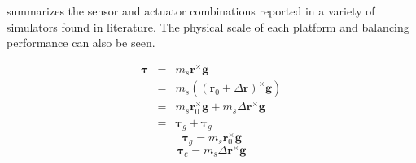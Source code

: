 summarizes the sensor and actuator combinations reported in a variety of simulators found in literature. The physical scale of each platform and balancing performance can also be seen. 

\begin{align}
    \bm{\tau} &=& m_s\bm{r}^{\times}\bm{g} \\
    &=&  m_s((\bm{r}_0+\Delta\bm{r})^{\times}\bm{g}) \\
    &=&  m_s\bm{r}_0^{\times}\bm{g} + m_s\Delta\bm{r}^{\times}\bm{g} \\
    &=&  \bm{\tau}_g+\bm{\tau}_g
\end{align}
\begin{equation}
    \bm{\tau}_g = m_s\bm{r}_0^{\times}\bm{g}
\end{equation}
\begin{equation}
    \bm{\tau}_c = m_s\Delta\bm{r}^{\times}\bm{g}
\end{equation}

